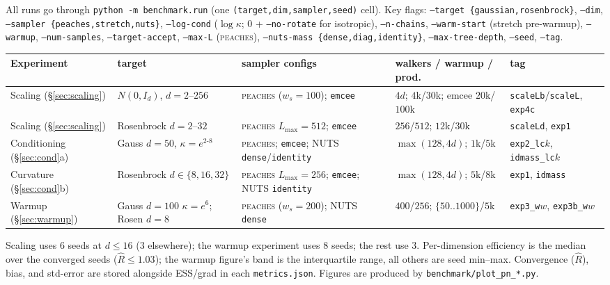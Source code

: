 \documentclass[11pt]{article}
\begin{document}
All runs go through \texttt{python -m benchmark.run} (one
\texttt{(target,dim,sampler,seed)} cell). Key flags:
\texttt{--target \{gaussian,rosenbrock\}}, \texttt{--dim}, \texttt{--sampler
\{peaches,stretch,nuts\}}, \texttt{--log-cond} ($\log\kappa$; $0$ + \texttt{--no-rotate}
for isotropic), \texttt{--n-chains}, \texttt{--warm-start} (stretch pre-warmup),
\texttt{--warmup}, \texttt{--num-samples}, \texttt{--target-accept},
\texttt{--max-L} (\textsc{peaches}), \texttt{--nuts-mass \{dense,diag,identity\}},
\texttt{--max-tree-depth}, \texttt{--seed}, \texttt{--tag}.

\begin{center}\small
\begin{tabular}{lllll}
\toprule
Experiment & target & sampler configs & walkers / warmup / prod. & tag \\
\midrule
Scaling (\S\ref{sec:scaling})
  & $N(0,I_d)$, $d{=}2$--$256$
  & \textsc{peaches} ($w_s{=}100$); \texttt{emcee}
  & $4d$; $4$k/$3$0k; emcee $20$k/$100$k & \texttt{scaleLb}/\texttt{scaleL}, \texttt{exp4c} \\
Scaling (\S\ref{sec:scaling})
  & Rosenbrock $d{=}2$--$32$
  & \textsc{peaches} $L_{\max}{=}512$; \texttt{emcee}
  & $256$/$512$; $12$k/$30$k & \texttt{scaleLd}, \texttt{exp1} \\
Conditioning (\S\ref{sec:cond}a)
  & Gauss $d{=}50$, $\kappa{=}e^{2\text{-}8}$
  & \textsc{peaches}; \texttt{emcee}; NUTS \texttt{dense}/\texttt{identity}
  & $\max(128,4d)$; $1$k/$5$k & \texttt{exp2\_lc$k$}, \texttt{idmass\_lc$k$} \\
Curvature (\S\ref{sec:cond}b)
  & Rosenbrock $d{\in}\{8,16,32\}$
  & \textsc{peaches} $L_{\max}{=}256$; \texttt{emcee}; NUTS \texttt{identity}
  & $\max(128,4d)$; $5$k/$8$k & \texttt{exp1}, \texttt{idmass} \\
Warmup (\S\ref{sec:warmup})
  & Gauss $d{=}100$ $\kappa{=}e^6$; Rosen $d{=}8$
  & \textsc{peaches} ($w_s{=}200$); NUTS \texttt{dense}
  & $400$/$256$; $\{50..1000\}$/$5$k & \texttt{exp3\_w$w$}, \texttt{exp3b\_w$w$} \\
\bottomrule
\end{tabular}
\end{center}
\noindent
Scaling uses $6$ seeds at $d\le16$ ($3$ elsewhere); the warmup experiment uses
$8$ seeds; the rest use $3$. Per-dimension efficiency is the median over the
converged seeds ($\hat R\le1.03$); the warmup figure's band is the interquartile
range, all others are seed min--max. Convergence ($\hat R$), bias, and std-error
are stored alongside ESS/grad in each \texttt{metrics.json}. Figures are produced
by \texttt{benchmark/plot\_pn\_*.py}.
\end{document}
